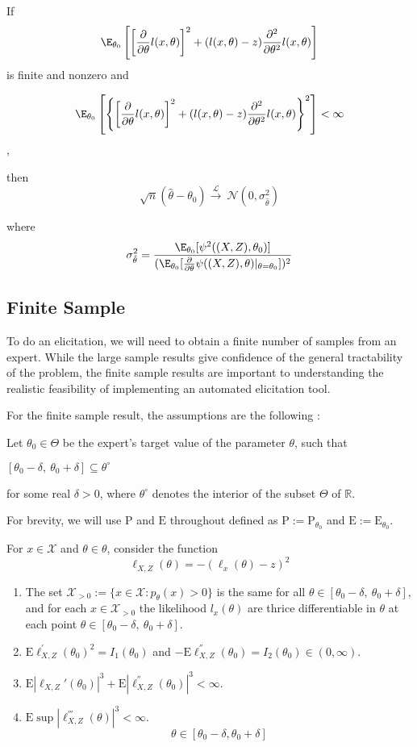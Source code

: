 If $$\E_{\theta_0} \left[ \left[ \frac{\partial}{\partial \theta}l(x,\theta) \right]^2  + (l(x,\theta)-z) \frac{\partial^2}{\partial \theta^2}l(x,\theta) \right] $$ is finite and nonzero and 

$$
\E_{\theta_0} \left[ \left\lbrace \left[ \frac{\partial}{\partial \theta}l(x,\theta) \right]^2  + (l(x,\theta)-z) \frac{\partial^2}{\partial \theta^2}l(x,\theta)\right\rbrace^2 \right] < \infty
$$,

then $$\sqrt{n}(\hat{\theta}-\theta_0) \xrightarrow{\mathcal{L}}\ \mathcal{N}(0,\sigma_{\hat{\theta}}^2)$$

where $$\sigma_{\hat{\theta}}^2 = \frac{\E_{\theta_0}[\psi^2((X,Z),\theta_0)]}{(\E_{\theta_0} [\frac{\partial}{\partial \theta} \psi((X,Z),\theta)|_{\theta=\theta_0}])^2}$$


\subsection{Finite Sample}

To do an elicitation, we will need to obtain a finite number of samples from an expert.
While the large sample results give confidence of the general tractability of the problem, the finite sample results are important to understanding the realistic feasibility of implementing an automated elicitation tool.  


For the finite sample result, the assumptions are the following \cite{Pinelis2017}:


Let $\theta_{0}\in \Theta$ be the expert's target value of the parameter $\theta$, such that
\begin{center}
	$[\theta_{0}-\delta,\ \theta_{0}+\delta]\subseteq \theta^{\circ}$ 
\end{center}
for some real $\delta>0$, where $\theta^{\circ}$ denotes the interior of the subset $\Theta$ of $\mathbb{R}$. 

For brevity, we will use $\mathrm{P}$ and $\mathrm{E}$ throughout defined as $\mathrm{P} :=\mathrm{P}_{\theta_{0}}$ and $\mathrm{E} :=\mathrm{E}_{\theta_{0}}.$

For $x\in \mathcal{X}$ and $\theta\in \theta$, consider the function
$$
\ell_{X,Z}(\theta)=- (\ell_x(\theta)-z)^2
$$

\begin{enumerate}
	\item The set $\mathcal{X}_{>0} :=\{x\in \mathcal{X}:p_{\theta}(x)>0\}$ is the same for all $\theta\in [\theta_{0}-\delta,\ \theta_{0}+\delta],$ and for each $x\in \mathcal{X}_{>0}$ the likelihood $l_{x}(\theta)$ are thrice differentiable in $\theta$ at each point $\theta\in [\theta_{0}-\delta,\ \theta_{0}+\delta].$
	\item $\mathrm{E}\ell_{X,Z}^{'}(\theta_{0})^{2}=I_1(\theta_0)$ and $-\mathrm{E}\ell_{X,Z}^{''}(\theta_{0})=I_2(\theta_{0})\in (0,\infty)$.
	\item $\mathrm{E}|\ell_{X,Z}'(\theta_{0})|^{3}+\mathrm{E}|\ell_{X,Z}^{''}(\theta_{0})|^{3}<\infty.$
	\item $\mathrm{E} \sup |\ell_{X,Z}^{'''}(\theta)|^{3}<\infty.$
	$$
	\theta\in [\theta_0-\delta,\theta_0+\delta]
	$$
\end{enumerate}

